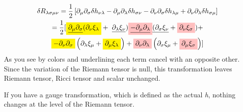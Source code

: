 \begin{gather*}
	\delta R_{\lambda \sigma \mu \nu } = \frac{1}{2}\left[ \partial_{\mu }\partial_{\sigma }\delta h_{\nu \lambda } - \partial_{\mu }\partial_{\lambda }\delta h_{\sigma \nu } - \partial_{\nu }\partial_{\sigma }\delta h_{\lambda \mu } + \partial_{\nu }\partial_{\lambda }\delta h_{\sigma \mu } \right]\\
	= \frac{1}{2}[ \colorbox{yellow}{\underline{$ \partial_{\mu }\partial_{\sigma }$}$( \partial_{\nu }\xi _{\lambda }$}+ \text{ \underline{$\partial_{\lambda }\xi _{\nu }$}} ) \colorbox{pink}{\underline{$-  \partial_{\mu }\partial_{\lambda }$}}\text{\underline{$( \partial_{\sigma }\xi _{\nu }$}}+ \colorbox{pink}{$ \partial_{\nu }\xi _{\sigma }$}) + \\
	\colorbox{yellow}{$ - \partial_{\nu }\partial_{\sigma }$}\left( \partial_{\lambda }\xi _{\mu }+ \colorbox{yellow}{$ \partial_{\mu }\xi _{\lambda } $}\right) + \colorbox{pink}{$ \partial_{\nu }\partial_{\lambda }$}\left( \partial_{\sigma }\xi _{\mu }+ \colorbox{pink}{$ \partial_{\mu }\xi _{\sigma }$} \right) ] 
\end{gather*}
As you see by colors and underlining each term cancel with an opposite other. Since the variation of the Riemann tensor is null, this transformation leaves Riemann tensor, Ricci tensor and scalar unchanged.\par

If you have a gauge transformation, which is defined as the actual \emph{h}, nothing changes at the level of the Riemann tensor. 
